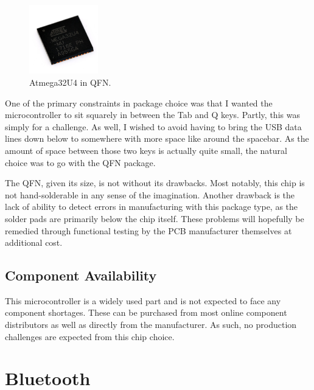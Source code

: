 \documentclass[11pt]{article}
\begin{document}
\vspace{1.5cm}

\begin{figure}
	\centering
	\includegraphics[width=3cm]{images/atmega32u4-qfn}
	\caption{Atmega32U4 in QFN.}
\end{figure}	

One of the primary constraints in package choice was that I wanted the microcontroller to sit squarely in between the Tab and Q keys. Partly, this was simply for a challenge. As well, I wished to avoid having to bring the USB data lines down below to somewhere with more space like around the spacebar. As the amount of space between those two keys is actually quite small, the natural choice was to go with the QFN package.

The QFN, given its size, is not without its drawbacks. Most notably, this chip is not hand-solderable in any sense of the imagination.\footnotemark {} Another drawback is the lack of ability to detect errors in manufacturing with this package type, as the solder pads are primarily below the chip itself. These problems will hopefully be remedied through functional testing by the PCB manufacturer themselves at additional cost.

\subsection{Component Availability}

This microcontroller is a widely used part and is not expected to face any component shortages. These can be purchased from most online component distributors as well as directly from the manufacturer. As such, no production challenges are expected from this chip choice.

\section{Bluetooth}
\end{document}
